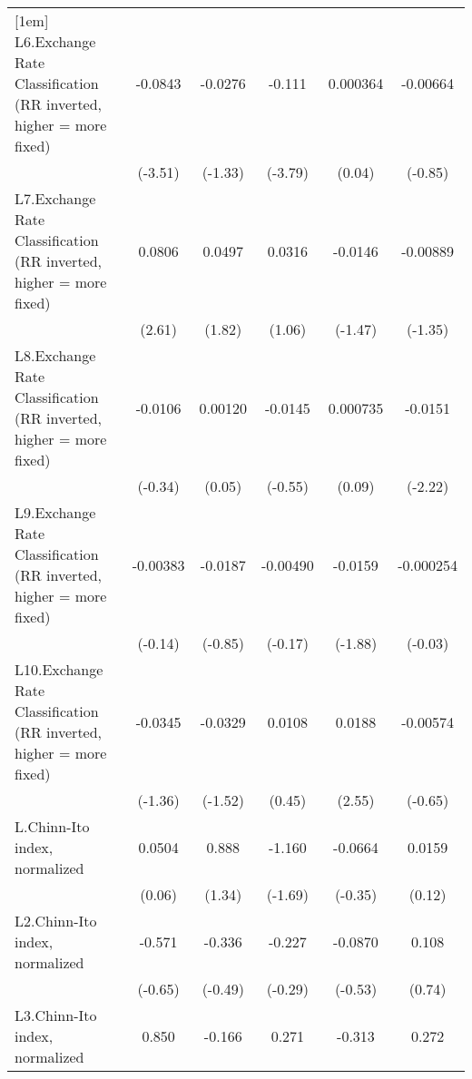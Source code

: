 {\begin{longtable}{l*{5}{c}}
[1em]
L6.Exchange Rate Classification (RR inverted, higher = more fixed)&  -0.0843\sym{***}&  -0.0276         &   -0.111\sym{***}& 0.000364         & -0.00664         \\
                &  (-3.51)         &  (-1.33)         &  (-3.79)         &   (0.04)         &  (-0.85)         \\
[1em]
L7.Exchange Rate Classification (RR inverted, higher = more fixed)&   0.0806\sym{*}  &   0.0497         &   0.0316         &  -0.0146         & -0.00889         \\
                &   (2.61)         &   (1.82)         &   (1.06)         &  (-1.47)         &  (-1.35)         \\
[1em]
L8.Exchange Rate Classification (RR inverted, higher = more fixed)&  -0.0106         &  0.00120         &  -0.0145         & 0.000735         &  -0.0151\sym{*}  \\
                &  (-0.34)         &   (0.05)         &  (-0.55)         &   (0.09)         &  (-2.22)         \\
[1em]
L9.Exchange Rate Classification (RR inverted, higher = more fixed)& -0.00383         &  -0.0187         & -0.00490         &  -0.0159         &-0.000254         \\
                &  (-0.14)         &  (-0.85)         &  (-0.17)         &  (-1.88)         &  (-0.03)         \\
[1em]
L10.Exchange Rate Classification (RR inverted, higher = more fixed)&  -0.0345         &  -0.0329         &   0.0108         &   0.0188\sym{*}  & -0.00574         \\
                &  (-1.36)         &  (-1.52)         &   (0.45)         &   (2.55)         &  (-0.65)         \\
[1em]
L.Chinn-Ito index, normalized&   0.0504         &    0.888         &   -1.160         &  -0.0664         &   0.0159         \\
                &   (0.06)         &   (1.34)         &  (-1.69)         &  (-0.35)         &   (0.12)         \\
[1em]
L2.Chinn-Ito index, normalized&   -0.571         &   -0.336         &   -0.227         &  -0.0870         &    0.108         \\
                &  (-0.65)         &  (-0.49)         &  (-0.29)         &  (-0.53)         &   (0.74)         \\
[1em]
L3.Chinn-Ito index, normalized&    0.850         &   -0.166         &    0.271         &   -0.313         &    0.272\sym{*}  \\

\end{longtable}}
